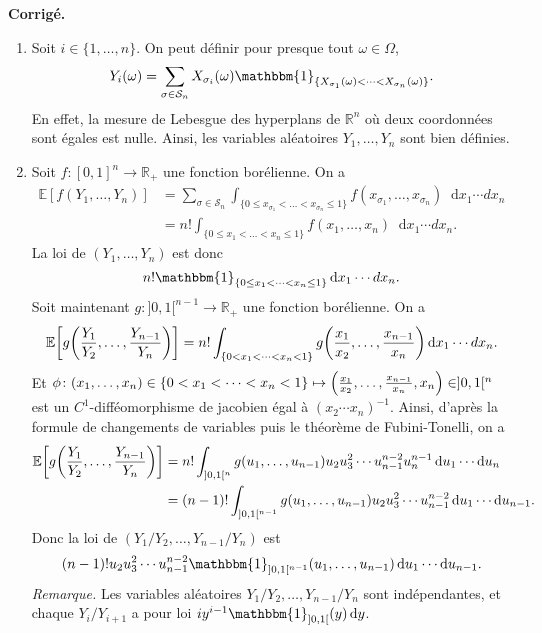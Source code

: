 \documentclass[a4paper,11pt]{article}
\let\originalleft\left
\let\originalright\right
\renewcommand{\left}{\mathopen{}\mathclose\bgroup\originalleft}
\renewcommand{\right}{\aftergroup\egroup\originalright}
\newcommand{\R}{\mathbb{R}}
\newcommand{\E}{\mathbb{E}}
\newcommand{\1}{\mathbbm{1}}
\newcommand{\cS}{\mathcal{S}}
\newcommand{\diff}{\mathop{}\mathopen{}\mathrm{d}}
\theoremstyle{plain}
\theoremstyle{definition}
\renewenvironment{comment}{\medskip\noindent \textcolor{BrickRed}{\textbf{Corrigé.}}}{}
\begin{document}
\begin{comment}
\begin{enumerate}
\item Soit $i\in\{1,\ldots,n\}$. On peut d\'efinir pour presque tout $\omega\in\Omega$, 
\[
Y_i(\omega) 
= \sum_{\sigma\in\cS_n} X_{\sigma_i}(\omega) 
\1_{\{X_{\sigma_1}(\omega)<\dots<X_{\sigma_n}(\omega)\}}.
\] 
En effet, la mesure de Lebesgue des hyperplans de $\R^n$ o\`u deux coordonn\'ees sont \'egales est nulle. Ainsi, les variables al\'eatoires $Y_1,\ldots,Y_n$ sont bien d\'efinies.  
\item Soit $f\colon [0,1]^n\to\R_+$ une fonction bor\'elienne. 
On a 
\begin{align*}
\E[f(Y_1,\dots,Y_n)]
&= \sum_{\sigma\in\cS_n} \int_{\{0\leq x_{\sigma_1}<\dots<x_{\sigma_n}\leq1\}} f(x_{\sigma_1},\dots,x_{\sigma_n}) \diff x_1 \cdots dx_n\\ 
&= n! \int_{\{0\leq x_1<\dots<x_n\leq1\}} f(x_1,\dots,x_n) \diff x_1\cdots dx_n.
\end{align*}
La loi de $(Y_1,\dots,Y_n)$ est donc 
\[
n!\1_{\{0\leq x_1<\dots<x_n\leq1\}} \diff x_1\cdots dx_n.
\]  
Soit maintenant $g \colon ]0,1[^{n-1}\to\R_+$ une fonction bor\'elienne. 
On a
\[
\E\left[ g\left(\frac{Y_1}{Y_2},\dots,\frac{Y_{n-1}}{Y_n}\right) \right]
= n! \int_{\{0<x_1<\dots<x_n<1\}} 
g\left(\frac{x_1}{x_2},\dots,\frac{x_{n-1}}{x_n}\right)\diff x_1 \cdots dx_n.
\]
Et $\phi \colon (x_1,\dots,x_n)\in\{0<x_1<\dots<x_n<1\} \mapsto \left(\frac{x_1}{x_2},\dots,\frac{x_{n-1}}{x_n},x_n\right) \in ]0,1[^n$ est un $C^1$-diff\'eomorphisme de jacobien \'egal \`a $(x_2\cdots x_n)^{-1}$. Ainsi, d'apr\`es la formule de changements de variables puis le th\'eor\`eme de Fubini-Tonelli, on a 
\begin{align*}
\E\left[ g\left(\frac{Y_1}{Y_2},\dots,\frac{Y_{n-1}}{Y_n}\right) \right]
&= n! \int_{]0,1[^n} g(u_1,\dots,u_{n-1}) u_2u_3^2\cdots u_{n-1}^{n-2}u_n^{n-1}
\diff u_1 \cdots \diff u_n\\ 
&= (n-1)! \int_{]0,1[^{n-1}} g(u_1,\dots,u_{n-1}) u_2u_3^2\cdots u_{n-1}^{n-2}
\diff u_1 \cdots \diff u_{n-1}.
\end{align*}
Donc la loi de $(Y_1/Y_2,\dots,Y_{n-1}/Y_n)$ est 
\[
(n-1)! u_2 u_3^2 \cdots u_{n-1}^{n-2} \1_{]0,1[^{n-1}}(u_1,\dots,u_{n-1})
\diff u_1 \cdots \diff u_{n-1}.
\] 
\emph{Remarque.} Les variables aléatoires $Y_1/Y_2,\dots,Y_{n-1}/Y_n$ sont ind\'ependantes, et chaque $Y_i/Y_{i+1}$ a pour loi $iy^{i-1}\1_{]0,1[}(y) \diff y$.
\end{enumerate}
\end{comment}
\end{document}
